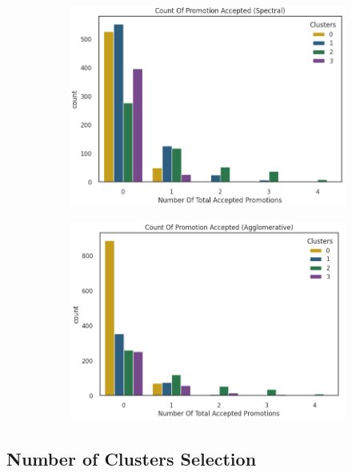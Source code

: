 \documentclass[11pt]{article}
\begin{document}
\vspace{1\baselineskip}
\begin{figure}[H]
\centering
\begin{subfigure}[b]{0.45\textwidth}
\centering
\includegraphics[width=\textwidth]{./images/image9.png}
\end{subfigure}
\hfill
\begin{subfigure}[b]{0.45\textwidth}
\centering
\includegraphics[width=\textwidth]{./images/image20.png}
\end{subfigure}
\end{figure}


\vspace{1\baselineskip}
\subsection{Number of Clusters Selection}
\end{document}
